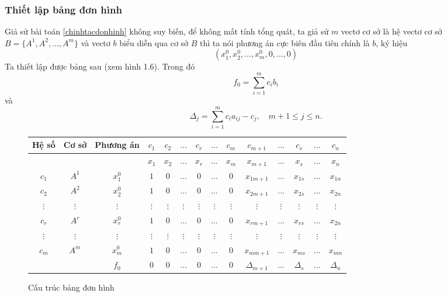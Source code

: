 \documentclass[12pt,a4paper]{report}
\begin{document}
\subsubsection*{Thiết lập bảng đơn hình}
Giả sử bài toán \eqref{chinhtacdonhinh} không suy biến, để không mất tính tổng quát, ta giả sử $m$ vectơ cơ sở là hệ vectơ cơ sở $B=\{A^1, A^2, \ldots , A^m\}$ và vectơ $b$ biểu diễn qua cơ sở $B$ thì ta nói phương án cực biên đầu tiên chính là $b$, ký hiệu
\begin{equation}
(x_1^0,x_2^0,\ldots,x_m^0,0,\ldots,0)
\end{equation}
Ta thiết lập được bảng sau (xem hình 1.6). Trong đó
\begin{equation}
    f_0 = \sum_{i=1}^m c_ib_i
\end{equation}
và
\begin{equation}
    \Delta _j= \sum_{i=1}^m c_ia_{ij}-c_j, \quad m+1\leq j \leq n .
\end{equation}

\begin{figure}
\begin{tabular} {|c|c|c|c|c|c|c|c|c|c|c|c|c|c|}
\hline
Hệ số & Cơ sở & Phương án & $c_1$ & $c_2$ & $\hdots$ & $c_r$ & $\hdots$ & $c_m$ & $c_{m+1}$ & $\hdots$ & $c_s$ & $\hdots$ & $c_n$ \\
\hline
&&& $x_1$ & $x_2$ & $\hdots$ & $x_r$ & $\hdots$ & $x_m$ & $x_{m+1}$ & $\hdots$ & $x_s$ & $\hdots$ & $x_n$ \\
\hline
$c_1$ & $A^1$ & $x_1^0$ & $1$ & $0$ & $\hdots$ & $0$ & $\hdots$ & $0$ & $x_{1m+1}$ & $\hdots$ & $x_{1s}$ & $\hdots$ & $x_{1n}$ \\
\hline
$c_2$ & $A^2$ & $x_2^0$ & $1$ & $0$ & $\hdots$ & $0$ & $\hdots$ & $0$ & $x_{2m+1}$ & $\hdots$ & $x_{2s}$ & $\hdots$ & $x_{2n}$ \\
$\vdots$&$\vdots$&$\vdots$&$\vdots$&$\vdots$&$\vdots$&$\vdots$&$\vdots$&$\vdots$&$\vdots$&$\vdots$&$\vdots$&$\vdots$&$\vdots$ \\
$c_r$ & $A^r$ & $x_r^0$ & $1$ & $0$ & $\hdots$ & $0$ & $\hdots$ & $0$ & $x_{rm+1}$ & $\hdots$ & $x_{rs}$ & $\hdots$ & $x_{2n}$ \\
$\vdots$&$\vdots$&$\vdots$&$\vdots$&$\vdots$&$\vdots$&$\vdots$&$\vdots$&$\vdots$&$\vdots$&$\vdots$&$\vdots$&$\vdots$&$\vdots$ \\
$c_m$ & $A^m$ & $x_m^0$ & $1$ & $0$ & $\hdots$ & $0$ & $\hdots$ & $0$ & $x_{mm+1}$ & $\hdots$ & $x_{ms}$ & $\hdots$ & $x_{mn}$ \\
\hline
&& $f_0$ & $0$ & $0$ & $\hdots$ & $0$ & $\hdots$ & $0$ & $\Delta_{m+1}$ & $\hdots$ & $\Delta_s$ & $\hdots$ & $\Delta_n$ \\
\hline
\end{tabular}
\caption{Cấu trúc bảng đơn hình}
\end{figure}
\end{document}
